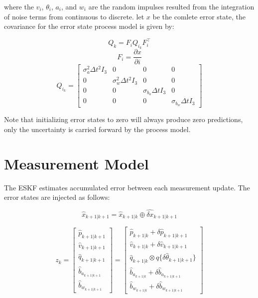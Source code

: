 \documentclass[]{article}
\begin{document}
where the $v_i$, $\theta_{i}$, $a_i$, and $w_i$ are the random impulses resulted from the integration of noise terms from continuous to discrete. let $x$ be the comlete error state, the covariance for the error state process model is given by:

\[Q_k = F_i Q_{i_k} F_i^\intercal\]
\[F_i = \frac{\partial x}{\partial i}\]
\[Q_{i_k} = 
\begin{bmatrix}
\sigma_{a}^2 \Delta t^2 I_3  &                           0 &                         0 & 0 \\
                          0  & \sigma_{w}^2 \Delta t^2 I_3 &                         0 & 0 \\
                          0  &                           0 & \sigma_{b_a} \Delta t I_3 & 0 \\
                          0  &                           0 &                         0 & \sigma_{b_w} \Delta t I_3
\end{bmatrix}
\]

Note that initializing error states to zero will always produce zero predictions, only the uncertainty is carried forward by the process model.

\section{Measurement Model}

The ESKF estimates accumulated error between each measurement update. The error states are injected as follows:

\[\hat{x}_{k+1|k+1} = \hat{x}_{k+1|k} \oplus \hat{\delta x}_{k+1|k+1}\]

\[
z_k = 
\begin{bmatrix}
\hat{p}_{k+1|k+1} \\
\hat{v}_{k+1|k+1} \\
\hat{q}_{k+1|k+1} \\
\hat{b}_{a_{k+1|k+1}} \\
\hat{b}_{w_{k+1|k+1}}
\end{bmatrix} =
\begin{bmatrix}
\hat{p}_{k+1|k} + \delta \hat{p}_{k+1|k+1}\\
\hat{v}_{k+1|k} + \delta \hat{v}_{k+1|k+1}\\
\hat{q}_{k+1|k} \otimes q\{\delta \hat{\theta}_{k+1|k+1}\}\\
\hat{b}_{a_{k+1|k}} + \delta \hat{b}_{a_{k+1|k+1}}\\
\hat{b}_{w_{k+1|k}} + \delta \hat{b}_{w_{k+1|k+1}}
\end{bmatrix}
\]
\end{document}
